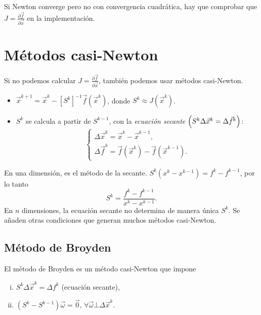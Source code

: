 \begin{obs}
    Si Newton converge pero no con convergencia cuadr\'atica, hay que comprobar que $J = \frac{\partial\vec{f}}{\partial\vec{x}}$ en la implementaci\'on.
\end{obs}

\section{M\'etodos casi-Newton}

\noindent Si no podemos calcular $J = \frac{\partial \vec{f}}{\partial \vec{x}}$, también podemos usar métodos casi-Newton.

\begin{itemize}
    \item $\vec{x}^{k+1} = \vec{x}^k - \left[ S^k \right]^{-1} \vec{f}\left( \vec{x}^k \right)$, donde $S^k \approx J\left( \vec{x}^k \right)$.
    \item $S^k$ se calcula a partir de $S^{k-1}$, con la \emph{ecuaci\'on secante} $\left( S^k\Delta\vec{x}^k = \Delta \vec{f}^k\right)$:
        \[
            \begin{cases}
                \Delta\vec{x}^k = \vec{x}^k - \vec{x}^{k-1}, \\
                \Delta\vec{f}^k = \vec{f}\left( \vec{x}^k \right) - \vec{f}\left( \vec{x}^{k-1} \right).
            \end{cases}
        \]
\end{itemize}

\begin{obs}
    En una dimensi\'on, es el m\'etodo de la secante. $S^k\left( x^k - x^{k-1} \right) = f^k - f^{k-1}$, por lo tanto
    \[
        S^k = \frac{f^k - f^{k-1}}{x^k - x^{k-1}}.
    \]
    En $n$ dimensiones, la ecuaci\'on secante no determina de manera \'unica $S^k$. Se añaden otras condiciones que generan muchos m\'etodos casi-Newton.
\end{obs}

\subsection{M\'etodo de Broyden}

\noindent El m\'etodo de Broyden es un m\'etodo casi-Newton que impone
\begin{enumerate}[i)]
    \item\label{item:broyden1} $S^k\Delta\vec{x}^k = \Delta f^k$ (ecuaci\'on secante),
    \item\label{item:broyden2} $\left( S^k - S^{k-1} \right)\vec{\omega} = \vec{0}, \, \forall \vec{\omega} \bot \Delta \vec{x}^k$.
\end{enumerate}

